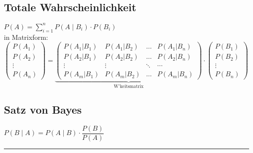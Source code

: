 \begin{minipage}[t]{0.6\textwidth}
	\vspace{2mm}
	\subsection{Totale Wahrscheinlichkeit}
		$\boxed{P(A)=\sum\limits_{i=1}^n P(A\mid B_i)\cdot P(B_i)}$ \\
	
		in Matrixform: \\
		$\begin{pmatrix}P(A_1)\\P(A_2)\\\vdots\\P(A_n)\end{pmatrix} = 
		\underbrace{\begin{pmatrix}P(A_1|B_1) & P(A_1|B_2) & \ldots & P(A_1|B_n) \\
		P(A_2|B_1) & P(A_2|B_2) & \ldots & P(A_2|B_n) \\
		\vdots & \vdots & \ddots & \cdots \\
		P(A_m|B_1) & P(A_m|B_2) & \ldots & P(A_m|B_n)\end{pmatrix}}_{\text{W'keitsmatrix}}
		\cdot \begin{pmatrix}P(B_1)\\P(B_2)\\\vdots\\P(B_n)\end{pmatrix}$
		\vspace{.2cm}
\end{minipage} \hspace{0.05\textwidth} \vrule \hspace{0.05\textwidth}
\begin{minipage}[t]{0.3\textwidth}
	\vspace{2mm}
	\subsection{Satz von Bayes}
	$\boxed{P(B\mid A)=P(A\mid B) \cdot\dfrac{P(B)}{P(A)}}$\\
	
	\vspace{.2cm}
\end{minipage}
\hrule

